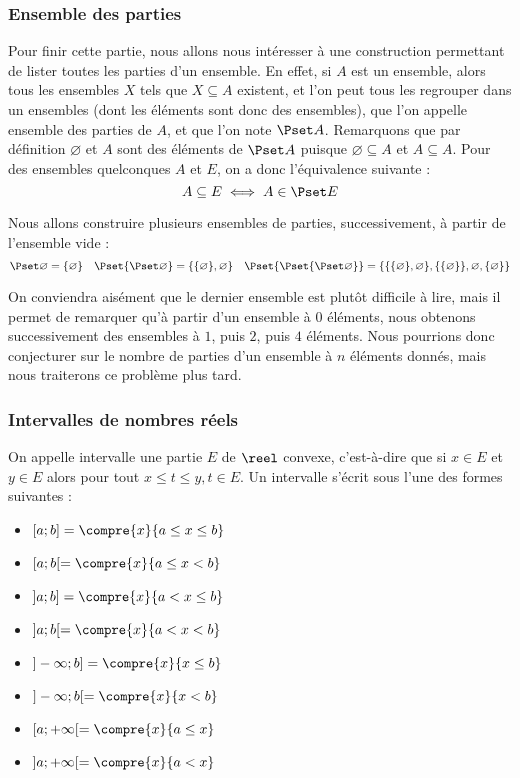 
\subsubsection{Ensemble des parties}

Pour finir cette partie, nous allons nous intéresser à une construction permettant de lister toutes les parties d'un ensemble. En effet, si $A$ est un ensemble, alors tous les ensembles $X$ tels que $X\subseteq A$ existent, et l'on peut tous les regrouper dans un ensembles (dont les éléments sont donc des ensembles), que l'on appelle ensemble des parties de $A$, et que l'on note $\Pset A$. Remarquons que par définition $\varnothing$ et $A$ sont des éléments de $\Pset A$ puisque $\varnothing\subseteq A$ et $A\subseteq A$. Pour des ensembles quelconques $A$ et $E$, on a donc l'équivalence suivante : $$A\subseteq E \iff A\in\Pset E$$

\begin{expl}
    Nous allons construire plusieurs ensembles de parties, successivement, à partir de l'ensemble vide :
    $$\Pset \varnothing = \{\varnothing\}\quad \Pset {\Pset \varnothing}=\{\{\varnothing\},\varnothing\}\quad \Pset{\Pset{\Pset \varnothing}} = \{\{\{\varnothing\},\varnothing\},\{\{\varnothing\}\},\varnothing,\{\varnothing\}\}$$
    
    On conviendra aisément que le dernier ensemble est plutôt difficile à lire, mais il permet de remarquer qu'à partir d'un ensemble à $0$ éléments, nous obtenons successivement des ensembles à $1$, puis $2$, puis $4$ éléments. Nous pourrions donc conjecturer sur le nombre de parties d'un ensemble à $n$ éléments donnés, mais nous traiterons ce problème plus tard.
\end{expl}

\subsubsection{Intervalles de nombres réels}

On appelle intervalle une partie $E$ de $\reel$ convexe, c'est-à-dire que si $x\in E$ et $y\in E$ alors pour tout $x\leq t\leq y, t\in E$. Un intervalle s'écrit sous l'une des formes suivantes :
\begin{itemize}[label=$\bullet$]
    \item $[a;b]=\compre{x}{a\leq x \leq b}$
    \item $[a;b[ = \compre{x}{a\leq x < b}$
    \item $]a;b] = \compre{x}{a< x \leq b}$
    \item $]a;b[ = \compre{x}{a < x < b}$
    \item $]-\infty;b] =\compre{x}{x \leq b}$
    \item $]-\infty;b[ = \compre{x}{x < b}$
    \item $[a;+\infty[ = \compre{x}{a\leq x}$
    \item $]a;+\infty[ = \compre{x}{a<x}$
\end{itemize}

